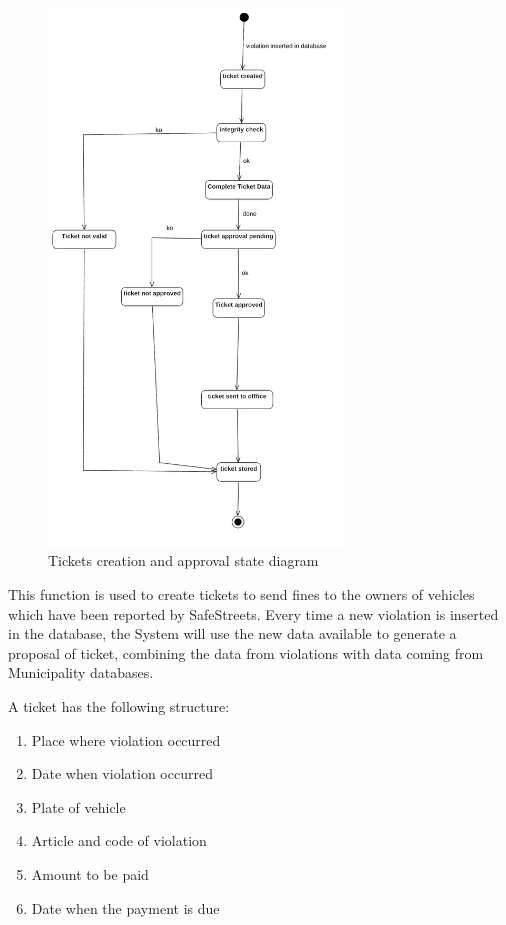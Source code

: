 \begin{figure}
\centering
\includegraphics[width=0.7\textwidth]{Images/ticketstate.png}
\caption{\label{fig:ticketstatediag} Tickets creation and approval state diagram}
\end{figure}

This function is used to create tickets to send fines to the owners of vehicles which have been reported by SafeStreets.
Every time a new violation is inserted in the database, the System will use the new data available to generate a proposal of ticket, combining the data from violations with data coming from Municipality databases.

A ticket has the following structure:
\begin{enumerate}
  \item Place where violation occurred
  \item Date when violation occurred
  \item Plate of vehicle
  \item Article and code of violation
  \item Amount to be paid
  \item Date when the payment is due
\end{enumerate}

